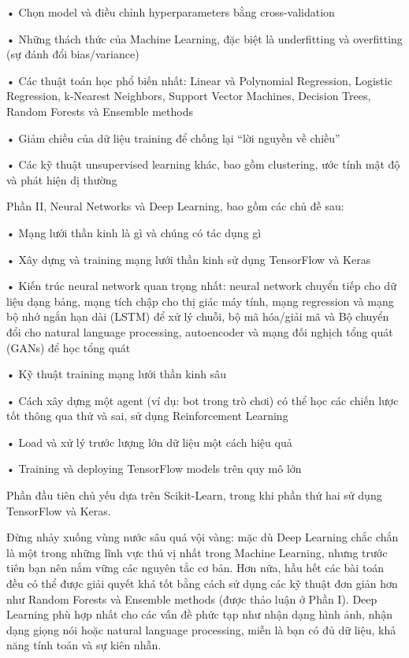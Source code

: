 • Chọn model và điều chỉnh hyperparameters bằng cross-validation

• Những thách thức của Machine Learning, đặc biệt là underfitting và overfitting (sự đánh đổi bias/variance)

• Các thuật toán học phổ biến nhất: Linear và Polynomial Regression, Logistic Regression, k-Nearest Neighbors, Support Vector Machines, Decision Trees, Random Forests và Ensemble methods

• Giảm chiều của dữ liệu training để chống lại “lời nguyền về chiều”

• Các kỹ thuật unsupervised learning khác, bao gồm clustering, ước tính mật độ và phát hiện dị thường

Phần II, Neural Networks và Deep Learning, bao gồm các chủ đề sau:

• Mạng lưới thần kinh là gì và chúng có tác dụng gì

• Xây dựng và training mạng lưới thần kinh sử dụng TensorFlow và Keras

• Kiến trúc neural network quan trọng nhất: neural network chuyển tiếp cho dữ liệu dạng bảng, mạng tích chập cho thị giác máy tính, mạng regression và mạng bộ nhớ ngắn hạn dài (LSTM) để xử lý chuỗi, bộ mã hóa/giải mã và Bộ chuyển đổi cho natural language processing, autoencoder và mạng đối nghịch tổng quát (GANs) để học tổng quát

• Kỹ thuật training mạng lưới thần kinh sâu

• Cách xây dựng một agent (ví dụ: bot trong trò chơi) có thể học các chiến lược tốt thông qua thử và sai, sử dụng Reinforcement Learning

• Load và xử lý trước lượng lớn dữ liệu một cách hiệu quả

• Training và deploying TensorFlow models trên quy mô lớn

Phần đầu tiên chủ yếu dựa trên Scikit-Learn, trong khi phần thứ hai sử dụng TensorFlow và Keras.

Đừng nhảy xuống vùng nước sâu quá vội vàng: mặc dù Deep Learning chắc chắn là một trong những lĩnh vực thú vị nhất trong Machine Learning, nhưng trước tiên bạn nên nắm vững các nguyên tắc cơ bản. Hơn nữa, hầu hết các bài toán đều có thể được giải quyết khá tốt bằng cách sử dụng các kỹ thuật đơn giản hơn như Random Forests và Ensemble methods (được thảo luận ở Phần I). Deep Learning phù hợp nhất cho các vấn đề phức tạp như nhận dạng hình ảnh, nhận dạng giọng nói hoặc natural language processing, miễn là bạn có đủ dữ liệu, khả năng tính toán và sự kiên nhẫn.

